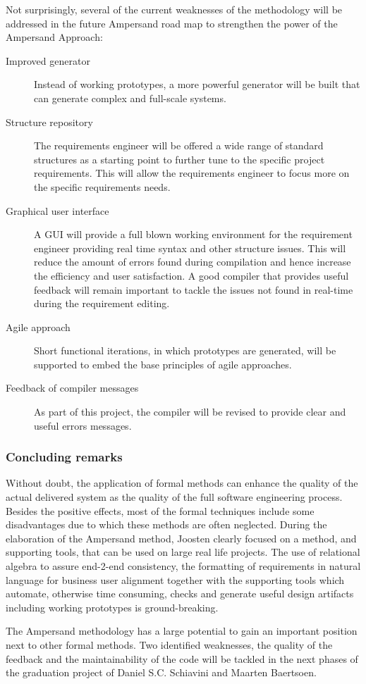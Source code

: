 Not surprisingly, several of the current weaknesses of the methodology will be addressed in the future Ampersand road map to strengthen the power of the Ampersand Approach:
\begin{description}
	\item[Improved generator] Instead of working prototypes, a more powerful generator will be built that can generate complex and full-scale systems.
	\item[Structure repository] The requirements engineer will be offered a wide range of standard structures as a starting point to further tune to the specific project requirements.
	This will allow the requirements engineer to focus more on the specific requirements needs.
	\item[Graphical user interface] A GUI will provide a full blown working environment for the requirement engineer providing real time syntax and other structure issues. 
	This will reduce the amount of errors found during compilation and hence increase the efficiency and user satisfaction. 
	A good compiler that provides useful feedback will remain important to tackle the issues not found in real-time during the requirement editing.
	\item[Agile approach] Short functional iterations, in which prototypes are generated, will be supported to embed the base principles of agile approaches.
	\item[Feedback of compiler messages] As part of this project, the compiler will be revised to provide clear and useful errors messages.
\end{description}

\subsubsection{Concluding remarks}
Without doubt, the application of formal methods can enhance the quality of the actual delivered system as the quality of the full software engineering process. 
Besides the positive effects, most of the formal techniques include some disadvantages due to which these methods are often neglected. 
During the elaboration of the Ampersand method, Joosten clearly focused on a method, and supporting tools, that can be used on large real life projects. 
The use of relational algebra to assure end-2-end consistency, the formatting of requirements in natural language for business user alignment together with the supporting tools which automate, otherwise time consuming, checks and  generate useful design artifacts including working prototypes is ground-breaking.

The Ampersand methodology has a large potential to gain an important position next to other formal methods. 
Two identified weaknesses, the quality of the feedback and the maintainability of the code will be tackled in the next phases of the graduation project of  Daniel S.C. Schiavini and Maarten Baertsoen.






